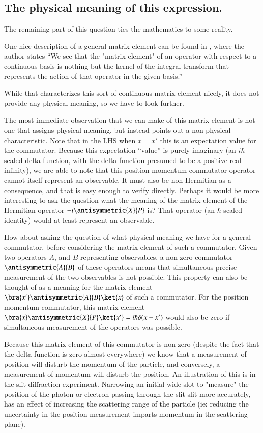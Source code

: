\subsection{The physical meaning of this expression.}

The remaining part of this question ties the mathematics to some reality.

One nice description of a general matrix element can be found in \cite{ bohrBerkleyPhy221}, where the author states ``We see that the "matrix element" of an operator with respect to a continuous basis is nothing but the kernel of the integral transform that represents the action of that operator in the given basis.''

While that characterizes this sort of continuous matrix element nicely, it does not provide any physical meaning, so we have to look further.

The most immediate observation that we can make of this matrix element is not one that assigns physical meaning, but instead points out a non-physical characteristic.  Note that in the LHS when $x=x'$ this is an expectation value for the commutator.  Because this expectation ``value'' is purely imaginary (an $i\hbar$ scaled delta function, with the delta function presumed to be a positive real infinity), we are able to note that this position momentum commutator operator cannot itself represent an observable.  It must also be non-Hermitian as a consequence, and that is easy enough to verify directly.  Perhaps it would be more interesting to ask the question what the meaning of the matrix element of the Hermitian operator $-i \antisymmetric{X}{P}$ is?  That operator (an $\hbar$ scaled identity) would at least represent an observable.

How about asking the question of what physical meaning we have for a general commutator, before considering the matrix element of such a commutator.  Given two operators $A$, and $B$ representing observables, a non-zero commutator $\antisymmetric{A}{B}$ of these operators means that simultaneous precise measurement of the two observables is not possible.  This property can also be thought of as a meaning for the matrix element $\bra{x'}\antisymmetric{A}{B} \ket{x}$ of such a commutator.  For the position momentum commutator, this matrix element $\bra{x} \antisymmetric{X}{P} \ket{x'} = i \hbar \delta(x-x')$ would also be zero if simultaneous measurement of the operators was possible.

Because this matrix element of this commutator is non-zero (despite the fact that the delta function is zero almost everywhere) we know that a measurement of position will disturb the momentum of the particle, and conversely, a measurement of momentum will disturb the position.  An illustration of this is in the slit diffraction experiment.  Narrowing an initial wide slot to "measure" the position of the photon or electron passing through the slit slit more accurately, has an effect of increasing the scattering range of the particle (ie: reducing the uncertainty in the position measurement imparts momentum in the scattering plane).

